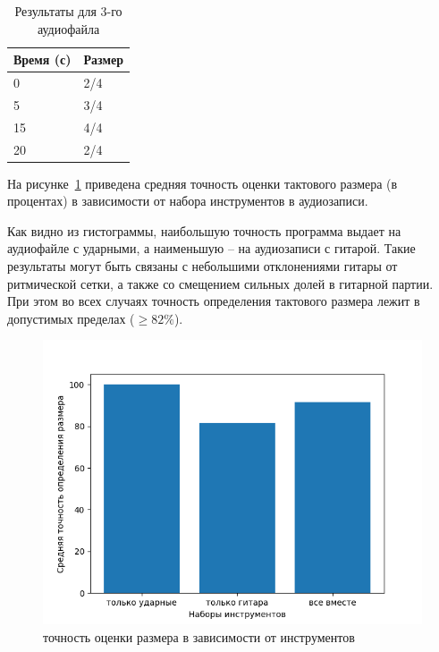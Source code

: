 \begin{table}[!h]
	\begin{center}
		\caption{\label{tab:hz_full}Результаты для 3-го аудиофайла}
		\begin{tabular}{|p{8cm}|p{8cm}|}
			\hline
			Время (с) & Размер\\
			\hline
			0 & 2/4\\
			\hline
			5 & 3/4\\
			\hline
			15 & 4/4\\
			\hline
			20 & 2/4\\
			\hline
		\end{tabular}
	\end{center}
\end{table}

На рисунке~\ref{img:measure_instr} приведена средняя точность оценки тактового размера (в процентах) в зависимости от набора инструментов в аудиозаписи.

\newpage

Как видно из гистограммы, наибольшую точность программа выдает на аудиофайле с ударными, а наименьшую -- на аудиозаписи с гитарой. Такие результаты могут быть связаны с небольшими отклонениями гитары от ритмической сетки, а также со смещением сильных долей в гитарной партии. При этом во всех случаях точность определения тактового размера лежит в допустимых пределах ($\ge82\%$).

\begin{figure}[h]
	\centering
	\includegraphics[scale=0.89]{../graphs/measure_instr.png}
	\caption{точность оценки размера в зависимости от инструментов}
	\label{img:measure_instr}
\end{figure}

